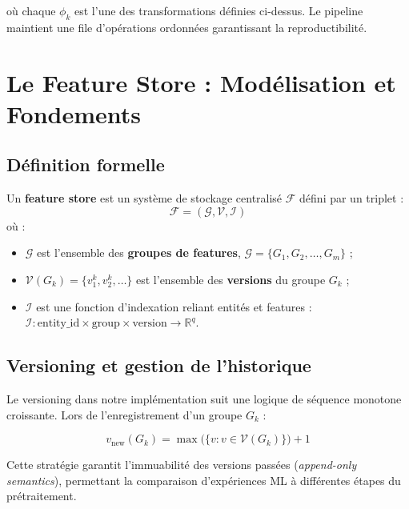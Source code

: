 \documentclass[12pt,a4paper]{article}
\newcounter{defcount}[section]
\newenvironment{definition}[1]{%
  \stepcounter{defcount}%
  \begin{tcolorbox}[defstyle={Définition \thesection.\thedefcount\ — #1}]
}{%
  \end{tcolorbox}
}
\begin{document}
où chaque $\phi_k$ est l'une des transformations définies ci-dessus.
Le pipeline maintient une file d'opérations ordonnées garantissant la
reproductibilité.

\section{Le Feature Store : Modélisation et Fondements}

\subsection{Définition formelle}

\begin{definition}{Feature Store}
Un \textbf{feature store} est un système de stockage centralisé $\mathcal{F}$ défini
par un triplet :
\begin{equation}
  \mathcal{F} = (\mathcal{G}, \mathcal{V}, \mathcal{I})
\end{equation}
où :
\begin{itemize}
  \item $\mathcal{G}$ est l'ensemble des \textbf{groupes de features},
    $\mathcal{G} = \{G_1, G_2, \ldots, G_m\}$ ;
  \item $\mathcal{V}(G_k) = \{v_1^k, v_2^k, \ldots\}$ est l'ensemble des
    \textbf{versions} du groupe $G_k$ ;
  \item $\mathcal{I}$ est une fonction d'indexation reliant entités et features :
    $\mathcal{I} : \text{entity\_id} \times \text{group} \times \text{version} \to \mathbb{R}^q$.
\end{itemize}
\end{definition}

\subsection{Versioning et gestion de l'historique}

Le versioning dans notre implémentation suit une logique de séquence monotone
croissante. Lors de l'enregistrement d'un groupe $G_k$ :

\begin{equation}
  v_{\text{new}}(G_k) = \max\bigl(\{v : v \in \mathcal{V}(G_k)\}\bigr) + 1
\end{equation}

Cette stratégie garantit l'immuabilité des versions passées
(\textit{append-only semantics}), permettant la comparaison d'expériences ML
à différentes étapes du prétraitement.
\end{document}
